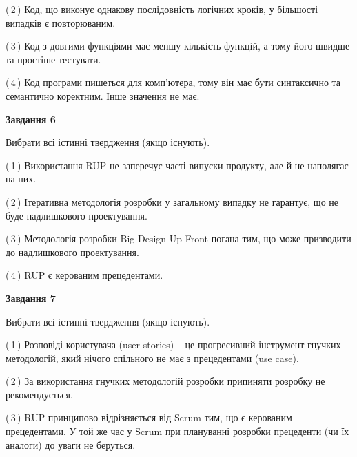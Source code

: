 \documentclass[10pt, ukrainian]{article}
\begin{document}
{\begin {large}
(\,2\,) Код, що виконує однакову послідовність логічних кроків, у більшості випадків є повторюваним.%



(\,3\,) Код з довгими функціями має меншу кількість функцій, а тому його швидше та простіше тестувати. %



(\,4\,) Код програми пишеться для комп'ютера, тому він має бути синтаксично та семантично коректним. Інше значення не має. %

\newpage

{\begin {center}\textbf{Завдання 6}\end {center}}\par
Вибрати всі істинні твердження (якщо існують).\par
\vspace{2mm}



(\,1\,) Використання RUP не заперечує часті випуски продукту, але й не наполягає на них. %



(\,2\,) Ітеративна методологія розробки у загальному випадку не гарантує, що не буде надлишкового проектування. %



(\,3\,) Методологія розробки Big Design Up Front погана тим, що може призводити до надлишкового проектування. %



(\,4\,) RUP є керованим прецедентами. %


{\begin {center}\textbf{Завдання 7}\end {center}}\par
Вибрати всі істинні твердження (якщо існують).\par
\vspace{2mm}



(\,1\,) Розповіді користувача (user stories) – це прогресивний інструмент гнучких методологій, який нічого спільного не має з прецедентами (use case). %



(\,2\,) За використання гнучких методологій розробки припиняти розробку не рекомендується. %



(\,3\,) RUP принципово відрізняється від Scrum тим, що є керованим прецедентами. У той же час у Scrum при плануванні розробки прецеденти (чи їх аналоги) до уваги не беруться. %




\end{large}}
\end{document}
